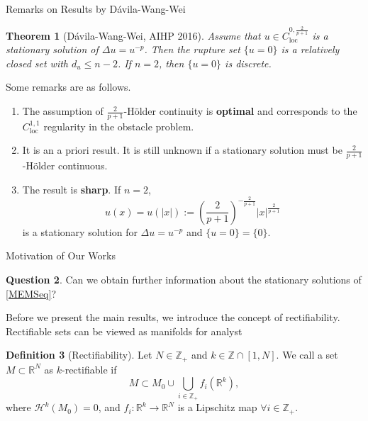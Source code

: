 \documentclass[11pt]{beamer}
\newcommand{\Z}{\mathbb{Z}}
\newcommand{\R}{\mathbb{R}}
\newcommand{\HH}{\mathcal{H}}
\newcommand{\f}{\frac}
\DeclareMathOperator{\loc}{loc}
\def\({\left(}                 \def\){\right)}
\theoremstyle{plain}
\newtheorem{thm}{Theorem}
\theoremstyle{definition}
\newtheorem{defn}[thm]{Definition}
\newtheorem{q}[thm]{Question}
\begin{document}
\begin{frame}{Remarks on Results by D\'{a}vila-Wang-Wei}

\begin{thm}[D\'{a}vila-Wang-Wei, AIHP 2016]
Assume that $ u\in C_{\loc}^{0,\f{2}{p+1}} $ is a stationary solution of $ \Delta u=u^{-p} $. Then the rupture set $ \{u=0\} $ is a relatively closed set with $ d_u\leq n-2 $. If $ n=2 $, then $ \{u=0\} $ is discrete.
\end{thm}
\pause
Some remarks are as follows.

\begin{enumerate}
\item The assumption of $ \f{2}{p+1} $-H\"{o}lder continuity is \textbf{optimal} and corresponds to the $ C_{\loc}^{1,1} $ regularity in the obstacle problem.
\item It is an a priori result. It is still unknown if a stationary solution must be $ \f{2}{p+1} $-H\"{o}lder continuous. \pause
\item The result is \textbf{sharp}. If $ n=2 $,
$$
u(x)=u(|x|):=\(\f{2}{p+1}\)^{-\f{2}{p+1}}|x|^{\f{2}{p+1}}
$$
is a stationary solution for $ \Delta u=u^{-p} $ and $ \{u=0\}=\{0\} $. 
\end{enumerate}

\end{frame}

\begin{frame}{Motivation of Our Works}

\begin{q}
Can we obtain further information about the stationary solutions of \eqref{MEMSeq}?
\end{q}
\pause
\vspace{1em}
Before we present the main results, we introduce the concept of rectifiability. Rectifiable sets can be viewed as manifolds for analyst

\vspace{1em}
\begin{defn}[Rectifiability]
Let $ N\in\Z_+ $ and $ k\in\Z\cap[1,N] $. We call a set $ M\subset\R^N $ as $ k $-rectifiable if
$$
M\subset M_0\cup\bigcup_{i\in\Z_+} f_i(\R^k),
$$
where $ \HH^k(M_0)=0 $, and $ f_i:\R^k\to\R^N $ is a Lipschitz map $ \forall i\in\Z_+ $.
\end{defn}

\end{frame}
\end{document}
